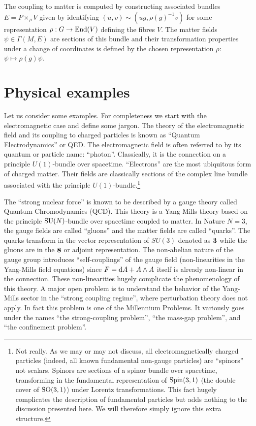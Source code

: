 \documentclass[12pt]{article}
\begin{document}
The coupling to matter is computed by constructing associated bundles $E=P\times_\rho V$ given by identifying $(u, v)\sim (u g, \rho(g)^{-1} v)$ for some representation $\rho: G\to {\rm End} (V)$ defining the fibres $V$. %
The matter fields $\psi\in \Gamma(M,E)$ are sections of this bundle and their transformation properties under a change of coordinates is defined by the chosen representation $\rho$: $\psi\mapsto \rho(g) \psi$.


\section{Physical examples}


Let us consider  some examples. For completeness we start with the electromagnetic case and define some jargon. The theory of the electromagnetic field and its coupling to charged particles is known as ``Quantum Electrodynamics'' or QED. The electromagnetic field is often referred to by its quantum or particle name: ``photon''. Classically, it is the connection on a principle $U(1)$-bundle over spacetime. ``Electrons'' are the most ubiquitous form of charged matter. Their fields are classically sections of the complex line bundle associated with the principle $U(1)$-bundle.\footnote{Not really. As we may or may not discuss, all electromagnetically charged particles (indeed, all known fundamental non-gauge particles) are ``spinors'' not scalars. Spinors are sections of a spinor bundle over spacetime, transforming in the fundamental representation of ${\rm Spin}({3,1})$ (the double cover of ${\rm SO}({3,1})$) under Lorentz transformations. This fact hugely complicates the description of fundamental particles but adds nothing to the discussion presented here. We will therefore simply ignore this extra structure.} 

The ``strong nuclear force'' is known to be described by a gauge theory called Quantum Chromodynamics (QCD). This theory is a Yang-Mills theory based on the principle ${\rm SU}(N)$-bundle over spacetime coupled to matter. In Nature $N=3$, the gauge fields are called ``gluons'' and the matter fields are called ``quarks''. The quarks transform in the vector representation of $SU(3)$ denoted as ${\bf 3}$ while the gluons are in the ${\bf 8}$ or adjoint representation. The non-abelian nature of the gauge group introduces ``self-couplings'' of the gauge field (non-linearities in the Yang-Mills field equations) since $F={\rm d}A+A\wedge A$ itself is already non-linear in the connection. These non-linearities hugely complicate the phenomenology of this theory. A major open problem is to understand the behavior of the Yang-Mills sector in the ``strong coupling regime'', where perturbation theory does not apply. In fact this problem is one of the Millennium Problems. It variously goes under the names ``the strong-coupling problem'', ``the mass-gap problem'', and ``the confinement problem''.
\end{document}
